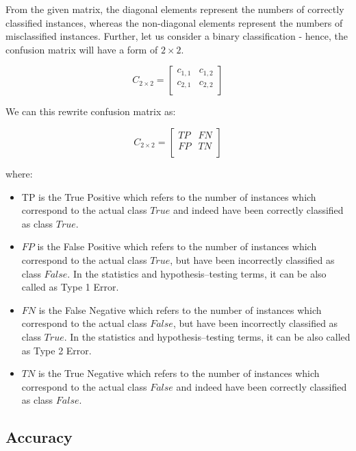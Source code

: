 From the given matrix, the diagonal elements represent the numbers of correctly classified instances, whereas the non-diagonal elements represent the numbers of misclassified instances.
Further, let us consider a binary classification - hence, the confusion matrix will have a form of $2\times 2$.

\begin{equation}
    C_{2 \times 2} = \begin{bmatrix}
    c_{1,1} & c_{1,2} \\
    c_{2,1} & c_{2,2} \\
    \end{bmatrix}
    \end{equation}


We can this rewrite confusion matrix as:

\begin{equation}
    C_{2 \times 2} = \begin{bmatrix}
    TP & FN \\
    FP & TN \\
    \end{bmatrix}
    \end{equation}

where:
\begin{itemize}\setlength\itemsep{0em}
    \item TP is the True Positive which refers to the number of instances which correspond to the actual class $True$ and indeed have been correctly classified as class $True$.
	\item $FP$ is the False Positive which refers to the number of instances which correspond to the actual class $True$, but have been incorrectly classified as class $False$. In the statistics and hypothesis--testing terms, it can be also called as Type 1 Error.
	\item $FN$ is the False Negative which refers to the number of instances which correspond to the actual class $False$, but have been incorrectly classified as class $True$. In the statistics and hypothesis--testing terms, it can be also called as Type 2 Error.
	\item $TN$ is the True Negative which refers to the number of instances which correspond to the actual class $False$ and indeed have been correctly classified as class $False$.
\end{itemize}

\subsection{Accuracy}

